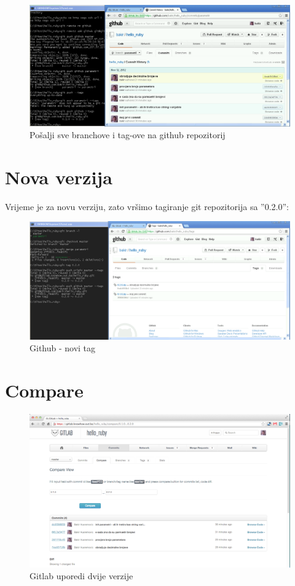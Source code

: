 \documentclass[times, utf8, seminar]{fit}
\begin{document}
\begin{figure}[H]
\centering
\includegraphics[width=15cm]{img/github_push_branches_and_tags.png}
\caption{Pošalji sve branchove i tag-ove na github repozitorij}
\end{figure}

\section{Nova verzija}

Vrijeme je za novu verziju, zato vršimo tagiranje git repozitorija sa ''0.2.0'':

\begin{figure}[H]
\centering
\includegraphics[width=16cm]{img/github_new_tag.png}
\caption{Github - novi tag}
\end{figure}


\section{Compare}

\begin{figure}[H]
\centering
\includegraphics[width=15cm]{img/gitlab_compare.png}
\caption{Gitlab uporedi dvije verzije}
\end{figure}
\end{document}
